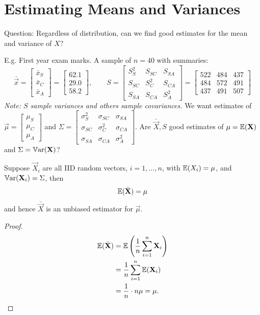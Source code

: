 \documentclass[10pt, a4paper]{article}
\begin{document}
\newpage

\section{Estimating Means and Variances}
Question:
Regardless of distribution,
can we find good estimates for the mean and variance of $X$?

E.g.
First year exam marks.
A sample of $n = 40$ with summaries:
\[
\bar{\vec{x}} = \begin{bmatrix}
    \bar{x}_S \\ \bar{x}_C \\ \bar{x}_A
\end{bmatrix} = \begin{bmatrix}
    62.1 \\ 29.0 \\ 58.2
\end{bmatrix}, \qquad S = \begin{bmatrix}
    S_S ^ 2 & S_{SC} & S_{SA} \\
    S_{SC} & S_{C} ^ 2 & S_{CA} \\
    S_{SA} & S_{CA} & S_{A} ^ 2
\end{bmatrix} = \begin{bmatrix}
    522 & 484 & 437 \\
    484 & 572 & 491 \\
    437 & 491 & 507
\end{bmatrix}
\]
\textit{Note:
$S$ sample variances and others sample covariances.}
We want estimates of $\vec{\mu} = \begin{bmatrix}
    \mu_S \\ \mu_C \\ \mu_A
\end{bmatrix}$
and $\Sigma = \begin{bmatrix}
    \sigma_S ^ 2 & \sigma_{SC} & \sigma_{SA} \\
    \sigma_{SC} & \sigma_{C} ^ 2 & \sigma_{CA} \\
    \sigma_{SA} & \sigma_{CA} & \sigma_A ^ 2
\end{bmatrix}$.
Are $\bar{\vec{X}}, S$ good estimates of $\mathbf{\mu} = \mathbb{E}(\mathbf{X})$ and $\Sigma = \mathbb{V}\mathrm{ar}(\mathbf{X})$?

\begin{proposition}[a]
    Suppose $\vec{X}_i$ are all IID random vectors,
    $i = 1, \dotsc, n$,
    with $\mathbb{E}(X_i) = \mathbf{\mu}$,
    and $\mathbb{V}\mathrm{ar}(\mathbf{X}_i) = \Sigma$,
    then
    \[
    \mathbb{E}(\bar{\mathbf{X}}) = \mathbf{\mu}
    \]
    and hence $\bar{\vec{X}}$ is an unbiased estimator for $\vec{\mu}$.

    \begin{proof}
        \begin{align*}
            \mathbb{E}(\bar{\mathbf{X}}) &= \mathbb{E}\left(\frac{1}{n}\sum_{i = 1}^{n}\mathbf{X}_i\right) \\
            &= \frac{1}{n}\sum_{i = 1}^{n}\mathbb{E}(\mathbf{X}_i) \\
            &= \frac{1}{n} \cdot n\mathbf{\mu} = \mathbf{\mu}.
        \end{align*}
    \end{proof}
\end{proposition}
\end{document}
